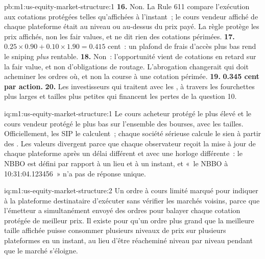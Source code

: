 \begin{solution}{pb:m1:us-equity-market-structure:1}
\textbf{16.} Non. La Rule 611 compare l'exécution aux cotations protégées
telles qu'affichées à l'instant~; le cours vendeur affiché de chaque plateforme était au niveau ou au-dessus du
prix payé. La règle protège les prix affichés, non les fair values, et ne dit
rien des cotations périmées.
\textbf{17.} $0.25\times0.90 + 0.10\times1.90 = 0.415$ cent~: un plafond de frais d'accès plus bas
rend le sniping \emph{plus} rentable.
\textbf{18.} Non~: l'opportunité vient de cotations en retard sur la fair value,
et non d'obligations de routage. L'abrogation changerait qui doit acheminer les ordres où,
et non la course à une cotation périmée.
\textbf{19.} \textbf{0.345 cent par action.}
\textbf{20.} Les investisseurs qui traitent avec les , à travers les
fourchettes plus larges et tailles plus petites qui financent les pertes de la question 10.
\end{solution}

\begin{solution}{iq:m1:us-equity-market-structure:1}
Le cours acheteur protégé le plus élevé et le cours vendeur protégé le plus bas sur l'ensemble des bourses, avec
les tailles. Officiellement, les SIP le calculent~; chaque société sérieuse calcule le sien
à partir des . Les valeurs divergent parce que chaque observateur reçoit la mise à jour de chaque plateforme
après un délai différent et avec une horloge différente~: le NBBO est
défini par rapport à un lieu et à un instant, et «~le NBBO à 10:31:04.123456~»
n'a pas de réponse unique.
\end{solution}

\begin{solution}{iq:m1:us-equity-market-structure:2}
Un ordre à cours limité marqué pour indiquer à la plateforme destinataire d'exécuter sans
vérifier les marchés voisins, parce que l'émetteur a simultanément envoyé des ordres pour
balayer chaque cotation protégée de meilleur prix. Il existe pour qu'un ordre plus grand
que la meilleure taille affichée puisse consommer plusieurs niveaux de prix sur plusieurs plateformes
en un instant, au lieu d'être réacheminé niveau par niveau pendant que le marché
s'éloigne.
\end{solution}


